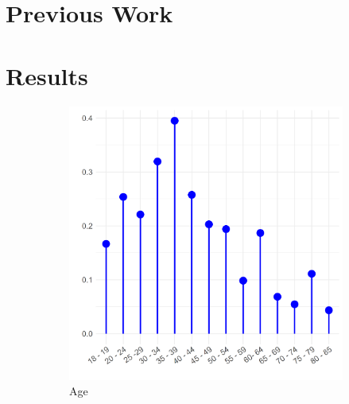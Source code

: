 \documentclass[12pt]{article}
\begin{document}
\section*{Previous Work}

\section*{Results}
\begin{figure}[ht!]
    \captionsetup[subfigure]{font=footnotesize,labelfont=footnotesize}
    \centering
     \begin{subfigure}[b]{0.45\textwidth}
        \includegraphics[width=1.0\textwidth]{Plots/uni-dist-cat-tol-age.png}
            \caption{Age}
            \label{fig:cat-tol-age}
    \end{subfigure}
     \begin{subfigure}[b]{0.45\textwidth}

\end{subfigure}
\end{figure}
\end{document}
